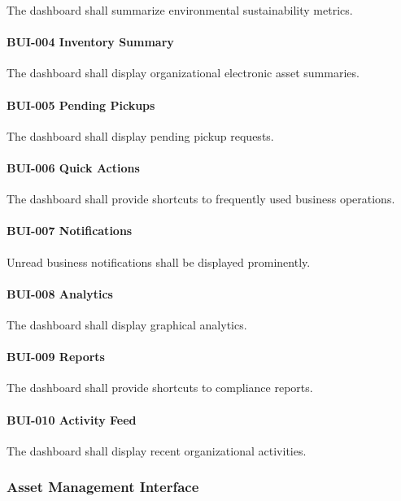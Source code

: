 The dashboard shall summarize environmental sustainability metrics.

\paragraph{BUI-004 Inventory Summary}

The dashboard shall display organizational electronic asset summaries.

\paragraph{BUI-005 Pending Pickups}

The dashboard shall display pending pickup requests.

\paragraph{BUI-006 Quick Actions}

The dashboard shall provide shortcuts to frequently used business
operations.

\paragraph{BUI-007 Notifications}

Unread business notifications shall be displayed prominently.

\paragraph{BUI-008 Analytics}

The dashboard shall display graphical analytics.

\paragraph{BUI-009 Reports}

The dashboard shall provide shortcuts to compliance reports.

\paragraph{BUI-010 Activity Feed}

The dashboard shall display recent organizational activities.


\subsubsection*{Asset Management Interface}

